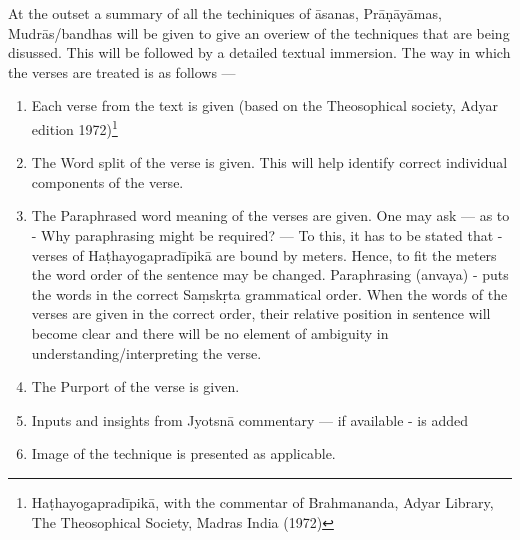 At the outset a summary of all the techiniques of āsanas, Prāṇāyāmas, Mudrās/bandhas will be given to give an overiew of the techniques that are being disussed. This will be followed by a detailed textual immersion. The way in which the verses are treated is as follows ---
\begin{enumerate}
\itemsep=0pt
\item Each verse from the text is given (based on the Theosophical society, Adyar edition 1972)\footnote{Haṭhayogapradīpikā, with the commentar of Brahmananda, Adyar Library, The Theosophical Society, Madras India (1972)}
\item The Word split of the verse is given. This will help identify correct individual components of the verse.   
\item The Paraphrased word meaning of the verses are given. One may ask --- as to - Why paraphrasing might be required? --- To this, it has to be stated that - verses of Haṭhayogapradīpikā are bound by meters. Hence, to fit the meters the word order of the sentence may be changed. Paraphrasing (anvaya) -  puts the words in the correct Saṃskṛta grammatical order. When the words of the verses are given in the correct order, their relative position in sentence will become clear and there will be no element of ambiguity in understanding/interpreting the verse.    
\item The Purport of the verse is given. 
\item Inputs and insights from Jyotsnā commentary --- if available - is added 
\item Image of the technique is presented as applicable.
\end{enumerate}
